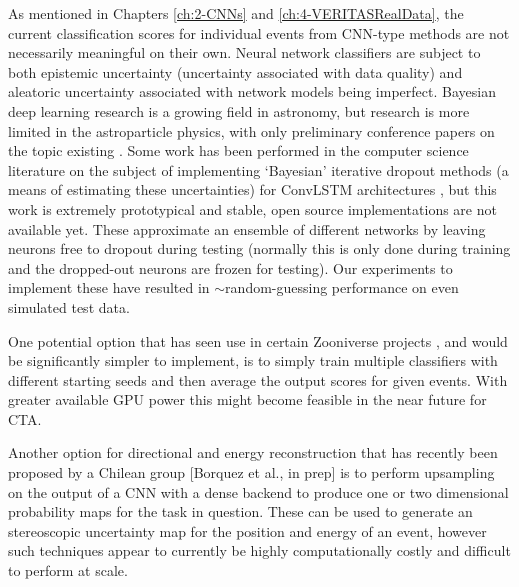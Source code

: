 As mentioned in Chapters \ref{ch:2-CNNs} and \ref{ch:4-VERITASRealData}, the current classification scores for individual events from CNN-type methods are not necessarily meaningful on their own. Neural network classifiers are subject to both epistemic uncertainty (uncertainty associated with data quality) and aleatoric uncertainty associated with network models being imperfect. Bayesian deep learning research is a growing field in astronomy, but research is more limited in the astroparticle physics, with only preliminary conference papers on the topic existing \cite{bayesianwcd}. Some work has been performed in the computer science literature on the subject of implementing `Bayesian' iterative dropout methods (a means of estimating these uncertainties) for ConvLSTM architectures \cite{bayesconv},  but this work is extremely prototypical and stable, open source implementations are not available yet. These approximate an ensemble of different networks by leaving neurons free to dropout during testing (normally this is only done during training and the dropped-out neurons are frozen for testing). Our experiments to implement these have resulted in $\sim$random-guessing performance on even simulated test data.

One potential option that has seen use in certain Zooniverse projects \cite{mike}, and would be significantly simpler to implement, is to simply train multiple classifiers with different starting seeds and then average the output scores for given events. With greater available GPU power this might become feasible in the near future for CTA.

Another option for directional and energy reconstruction that has recently been proposed by a Chilean group [Borquez et al., in prep] is to perform upsampling on the output of a CNN with a dense backend to produce one or two dimensional probability maps for the task in question. These can be used to generate an stereoscopic uncertainty map for the position and energy of an event, however such techniques appear to currently be highly computationally costly and difficult to perform at scale.

